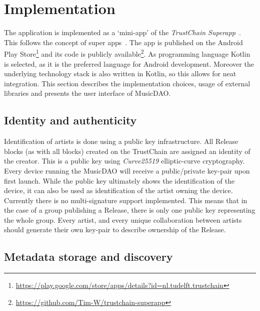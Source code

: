 \chapter{Implementation}
The application is implemented as a `mini-app' of the \textit{TrustChain Superapp}~\citep{mattskala2020}. This follows the concept of super apps~\citep{kpmg2019superapps}. The app is published on the Android Play Store\footnote{\url{https://play.google.com/store/apps/details?id=nl.tudelft.trustchain}} and its code is publicly available\footnote{\url{https://github.com/Tim-W/trustchain-superapp}}. As programming language Kotlin is selected, as it is the preferred language for Android development\cite{googleio2019}. Moreover the underlying technology stack is also written in Kotlin, so this allows for neat integration. This section describes the implementation choices, usage of external libraries and presents the user interface of MusicDAO.
\section{Identity and authenticity}
Identification of artists is done using a public key infrastructure. All Release blocks (as with all blocks) created on the TrustChain are assigned an identity of the creator. This is a public key using \textit{Curve25519} elliptic-curve cryptography. Every device running the MusicDAO will receive a public/private key-pair upon first launch. While the public key ultimately shows the identification of the device, it can also be used as identification of the artist owning the device. Currently there is no multi-signature support implemented. This means that in the case of a group publishing a Release, there is only one public key representing the whole group. Every artist, and every unique collaboration between artists should generate their own key-pair to describe ownership of the Release.

\section{Metadata storage and discovery}
